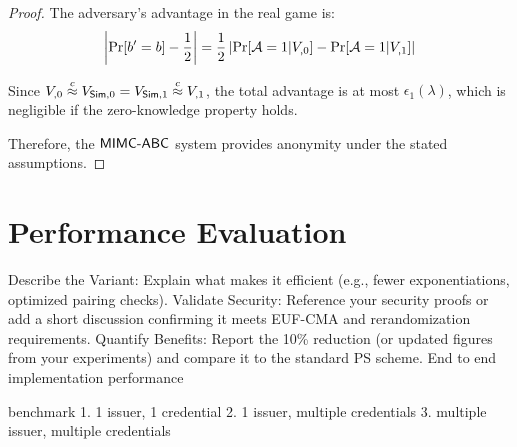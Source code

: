 \begin{proof}
    The adversary's advantage in the real game is:
    \[
    \left|\Pr[b' = b] - \frac{1}{2}\right| = \frac{1}{2} \left|\Pr[\Adv = 1 | V_{\real,0}] - \Pr[\Adv = 1 | V_{\real,1}]\right|
    \]
    
    Since $V_{\real,0} \stackrel{c}{\approx} V_{\Sim,0} = V_{\Sim,1} \stackrel{c}{\approx} V_{\real,1}$, the total advantage is at most $\epsilon_1(\lambda)$, which is negligible if the zero-knowledge property holds.
    
    Therefore, the $\mathsf{MIMC\text{-}ABC}$ system provides anonymity under the stated assumptions.
\end{proof}














\newpage
\section{Performance Evaluation}



Describe the Variant: Explain what makes it efficient (e.g., fewer exponentiations, optimized pairing checks).
Validate Security: Reference your security proofs or add a short discussion confirming it meets EUF-CMA and rerandomization requirements.
Quantify Benefits: Report the 10\% reduction (or updated figures from your experiments) and compare it to the standard PS scheme.
End to end implementation performance

benchmark
1. 1 issuer, 1 credential
2. 1 issuer, multiple credentials
3. multiple issuer, multiple credentials























